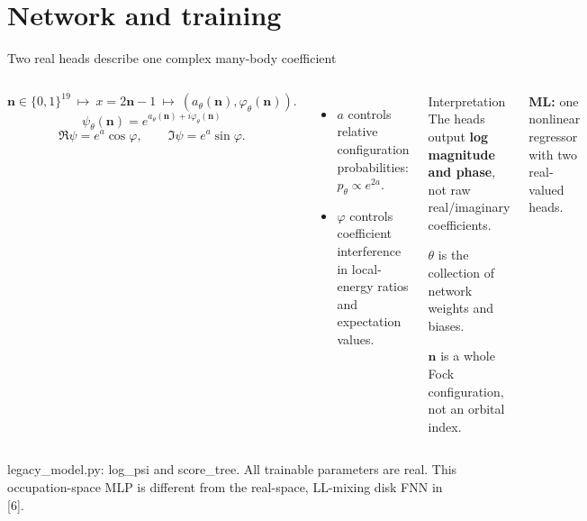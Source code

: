 \documentclass[aspectratio=169,10pt]{beamer}
\newcommand{\src}[1]{\vfill{\fontsize{6.3}{7.5}\selectfont\color{muted}#1\par}}
\newcommand{\ml}[1]{{\color{teal}\textbf{ML:} #1}}
\newcommand{\nn}{\mathbf n}
\begin{document}
\section{Network and training}
\begin{frame}{Two real heads describe one complex many-body coefficient}
\begin{columns}[T,onlytextwidth]
\[
\nn\in\{0,1\}^{19}\ \longmapsto\ x=2\nn-1
\ \longmapsto\ (a_\theta(\nn),\varphi_\theta(\nn)).
\]
\[
\boxed{\psi_\theta(\nn)=e^{a_\theta(\nn)+i\varphi_\theta(\nn)}}
\]
\[
\Re\psi=e^a\cos\varphi,\qquad \Im\psi=e^a\sin\varphi.
\]
\begin{itemize}\setlength\itemsep{6pt}
\item $a$ controls relative configuration probabilities: $p_\theta\propto e^{2a}$.
\item $\varphi$ controls coefficient interference in local-energy ratios and expectation values.
\end{itemize}
\begin{block}{Interpretation}
\small
The heads output \textbf{log magnitude and phase}, not raw real/imaginary coefficients.\par\medskip
$\theta$ is the collection of network weights and biases.\par\medskip
$\nn$ is a whole Fock configuration, not an orbital index.
\end{block}
\ml{one nonlinear regressor with two real-valued heads.}
\end{columns}
\src{legacy\_model.py: log\_psi and score\_tree. All trainable parameters are real. This occupation-space MLP is different from the real-space, LL-mixing disk FNN in [6].}
\end{frame}
\end{document}
